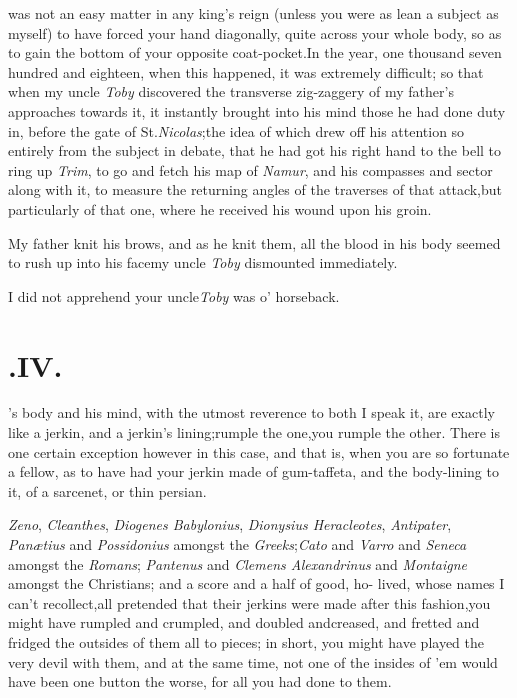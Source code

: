 \documentclass{article}
\begin{document}
 was not an easy matter in any
king’s reign (unless you were as lean a subject as myself) to
have forced your hand diagonally, quite across your whole body, so
as to gain the bottom of your opposite coat-pocket.\tsh In
the year, one thousand seven hundred and eighteen, when this
happened, it was extremely difficult; so that when my uncle
\textit{Toby} discovered the transverse zig-zaggery of my
father’s approaches towards it, it instantly brought into his
mind those he had done duty in, before the gate of
St.\@ \textit{Nicolas};\tsk the idea of which drew off his attention so
entirely from the subject in debate, that he had got his right
hand to the bell to ring up \textit{Trim}, to go and fetch
his map of \textit{Namur}, and his compasses and sector along with
it, to measure the returning angles of the traverses of that
attack,\tsk but particularly of that one, where he received his
wound upon his groin.

My father knit his brows, and as he knit them, all the blood in
his body seem\-ed to rush up into his face\tsh my uncle
\textit{Toby} dismounted immediately.

\tsk I did not apprehend your uncle\break \textit{Toby} was
o’ horseback.\tsh

\null
\section{.\quad  IV.}

’s body and his mind, with
the utmost reverence to both I speak it, are exactly like a jerkin,
and a jerkin’s lining;\tsk rumple the one,\tsk you rumple
the other. There is one certain exception however in this case, and
that is, when you are so fortunate a fellow, as to have had your
jerkin made of gum-taffeta, and the body-lining to it, of a
sarcenet, or thin persian.

\textit{Zeno}, \textit{Cleanthes}, \textit{Diogenes Babylonius}, 
\textit{Dionysius Heracleotes}, \textit{Antipater}, \textit{Panætius} and
\textit{Possidonius} amongst the \textit{Greeks};\tsh \textit{Cato} and
\textit{Varro} and \textit{Seneca} amongst the \textit{Romans};\tsk
\textit{Pantenus} and \textit{Clemens Alexan\-drinus} and \textit{Montaigne} amongst
the Christians; and a score and a half of good, ho-\break
{}
lived, whose names I can’t recollect,\tsk all pretended that their
jerkins were made after this fashion,\tsk you might have rumpled and crumpled, and
doubled and\break creased, and fretted and fridged the outsides of them all to pieces;\tsk
in short, you might have played the very devil with them, and at the same time,
not
one of the insides of ’em would have been one button the worse, for all you had
done to them.
\end{document}
